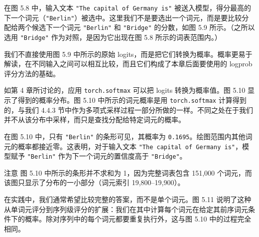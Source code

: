 在图 5.8 中，输入文本 \texttt{"}\texttt{The capital of Germany is}\texttt{"} 被送入模型，得分最高的下一个词元（\texttt{"}\texttt{Berlin}\texttt{"}）被选中。这里我们不是要选出一个词元，而是要比较分配给两个候选下一个词元 \texttt{"}\texttt{Berlin}\texttt{"} 和 \texttt{"}\texttt{Bridge}\texttt{"} 的分数，如图 5.9 所示。（之所以选用 \texttt{"}\texttt{Bridge}\texttt{"} 作为对照，是因为它出现在图 5.8 所示的词表范围内。）


我们不直接使用图 5.9 中所示的原始 logits，而是把它们转换为概率。概率更易于解读，在不同输入之间可以相互比较，而且它们构成了本章后面要使用的 logprob 评分方法的基础。

如第 4 章所讨论的，应用 \texttt{torch.softmax} 可以把 logits 转换为概率值。图 5.10 显示了得到的概率分布。图 5.10 中所示的词元概率是用 \texttt{torch.softmax} 计算得到的，与我们 4.4.3 节中作为多项式采样过程一部分所做的一样。不同之处在于我们并不从该分布中采样，而只是查找分配给特定词元的概率。


在图 5.10 中，只有 \texttt{"}\texttt{Berlin}\texttt{"} 的条形可见，其概率为 \texttt{0.1695}。绘图范围内其他词元的概率都接近零。这表明，对于输入文本 \texttt{"}\texttt{The capital of Germany is}\texttt{"}，模型赋予 \texttt{"}\texttt{Berlin}\texttt{"} 作为下一个词元的置信度高于 \texttt{"}\texttt{Bridge}\texttt{"}。

\begin{myWarning}{注意}
 图 5.10 中所示的条形并不求和为 1，因为完整词表包含 151,000 个词元，而该图只显示了分布的一小部分（词元索引 19,800–19,900）。\end{myWarning}

在实践中，我们通常希望比较完整的答案，而不是单个词元。图 5.11 说明了这种从单词元评分到序列级评分的扩展：我们在其中计算每个词元在给定其前序词元条件下的概率。除对序列中的每个词元都要重复执行外，这与图 5.10 中的过程完全相同。


